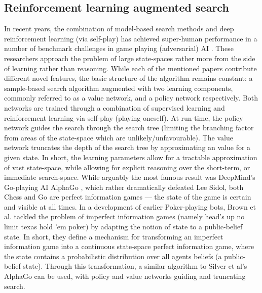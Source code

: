 \subsection{Reinforcement learning augmented search}
In recent years, the combination of model-based search methods and deep reinforcement learning (via self-play) has achieved super-human performance in a number of benchmark challenges in game playing (adversarial) AI \cite{AlphaGo,Brown2020,Lerer2019}. These researchers approach the problem of large state-spaces rather more from the side of learning rather than reasoning. \newline \newline
While each of the mentioned papers contribute different novel features, the basic structure of the algorithm remains constant: a sample-based search algorithm augmented with two learning components, commonly referred to as a value network, and a policy network respectively.
\newline \newline
Both networks are trained through a combination of supervised learning and reinforcement learning via self-play (playing oneself). At run-time, the policy network guides the search through the search tree (limiting the branching factor from areas of the state-space which are unlikely/unfavourable). The value network truncates the depth of the search tree by approximating an value for a given state. In short, the learning parameters allow for a tractable approximation of vast state-space, while allowing for explicit reasoning over the short-term, or immediate search-space. 
\newline \newline
While arguably the most famous result was DeepMind's Go-playing AI AlphaGo \cite{AlphaGo}, which rather dramatically defeated Lee Sidol, both Chess and Go are perfect information games --- the state of the game is certain and visible at all times. In a development of earlier Poker-playing bots, Brown et al. \cite{Brown2020} tackled the problem of imperfect information games (namely head's up no limit texas hold 'em poker) by adapting the notion of state to a public-belief state. In short, they define a mechanism for transforming an imperfect information game into a continuous state-space perfect information game, where the state contains a probabilistic distribution over all agents beliefs (a public-belief state). Through this transformation, a similar algorithm to Silver et al's AlphaGo can be used, with policy and value networks guiding and truncating search.   